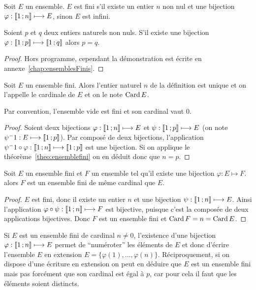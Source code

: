 \begin{defdef}
  Soit $E$ un ensemble. $E$ est fini s'il existe un entier $n$ non nul et une bijection $\varphi:\mathopen{\llbracket}1\mathclose{}\mathpunct{};n\mathclose{\rrbracket} \longmapsto E$, sinon $E$ est infini.
\end{defdef}
\begin{theo}\label{theo:ensemblefini}
  Soient $p$ et $q$ deux entiers naturels non nuls. S'il existe une bijection $\varphi:\mathopen{\llbracket}1\mathclose{}\mathpunct{};p\mathclose{\rrbracket} \longmapsto \mathopen{\llbracket}1\mathclose{}\mathpunct{};q\mathclose{\rrbracket}$ alors $p=q$.
\end{theo}
\begin{proof}
  Hors programme, cependant la démonstration est écrite en annexe~\ref{chap:ensemblesFinis}.
\end{proof}
\begin{prop}[Définition]
  Soit $E$ un ensemble fini. Alors l'entier naturel $n$ de la définition est unique et on l'appelle le cardinale de $E$ et on le note $\operatorname{Card} E$.
\end{prop}
Par convention, l'ensemble vide est fini et son cardinal vaut $0$.
\begin{proof}
  Soient deux bijections $\varphi:\mathopen{\llbracket}1\mathclose{}\mathpunct{};n\mathclose{\rrbracket} \longmapsto E$ et $\psi:\mathopen{\llbracket}1\mathclose{}\mathpunct{};p\mathclose{\rrbracket} \longmapsto E$ (on note $\psi^-1:E \longmapsto \mathopen{\llbracket}1\mathclose{}\mathpunct{};p\mathclose{\rrbracket}$). Par composé de deux bijections, l'application $\psi^-1\circ \varphi: \mathopen{\llbracket}1\mathclose{}\mathpunct{};n\mathclose{\rrbracket} \longmapsto \mathopen{\llbracket}1\mathclose{}\mathpunct{};p\mathclose{\rrbracket}$ est une bijection. Si on applique le théorème~\ref{theo:ensemblefini} on en déduit donc que $n=p$.
\end{proof}
\begin{prop}
  Soit $E$ un ensemble fini et $F$ un ensemble tel qu'il existe une bijection $\varphi:E\longmapsto F$. alors $F$ est un ensemble fini de même cardinal que $E$.
\end{prop}
\begin{proof}
  $E$ est fini, donc il existe un entier $n$ et une bijection $\psi:\mathopen{\llbracket}1\mathclose{}\mathpunct{};n\mathclose{\rrbracket} \longmapsto E$. Ainsi l'application $\varphi\circ\psi:\mathopen{\llbracket}1\mathclose{}\mathpunct{};n\mathclose{\rrbracket} \longmapsto F$ est bijective, puisque c'est la composée de deux applications bijectives. Donc $F$ est un ensemble fini et $\operatorname{Card} F=n=\operatorname{Card} E$.
\end{proof}

Si $E$ est un ensemble fini de cardinal $n\neq 0$, l'existence d'une bijection $\varphi:\mathopen{\llbracket}1\mathclose{}\mathpunct{};n\mathclose{\rrbracket} \longmapsto E$ permet de ``numéroter'' les éléments de $E$ et donc d'écrire l'ensemble $E$ en extension $E=\{\varphi(1), \ldots, \varphi(n)\}$.
Réciproquement, si on dispose d'une écriture en extension on peut en déduire que $E$ est un ensemble fini mais pas forcément que son cardinal est égal à $p$, car pour cela il faut que les éléments soient distincts.

